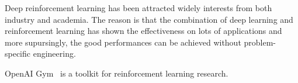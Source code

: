 

Deep reinforcement learning has been attracted widely interests from both
industry and academia. The reason is that the combination of deep learning and
reinforcement learning has shown the effectiveness on lots of applications
and more supursingly, the good performances can be achieved without problem-
specific engineering.






OpenAI Gym~\cite{brockman2016openai} is a toolkit for reinforcement learning research. 